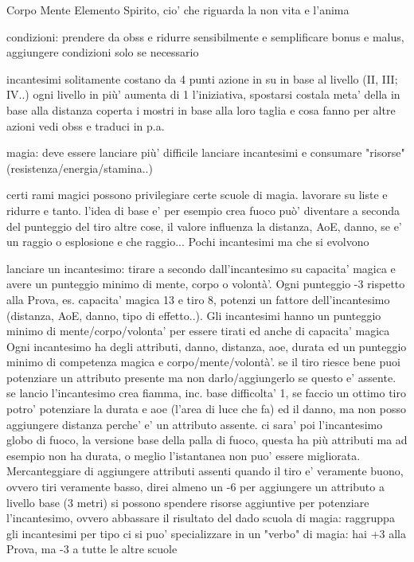 \documentclass[12pt,a4paper,twoside,openany]{book}
\begin{document}
Corpo
Mente
Elemento
Spirito, cio' che riguarda la non vita e l'anima






condizioni: prendere da obss e ridurre sensibilmente  e semplificare bonus e malus, aggiungere condizioni solo se necessario

incantesimi solitamente costano da 4 punti azione in su in base  al livello (II, III; IV..) ogni livello in più' aumenta di 1 l'iniziativa, spostarsi costala meta' della in base alla distanza coperta
i mostri in base alla loro taglia e cosa fanno
per altre azioni vedi obss e traduci in p.a.

magia: deve essere lanciare più' difficile lanciare incantesimi e consumare "risorse" (resistenza/energia/stamina..)

certi rami magici possono privilegiare certe scuole di magia. lavorare su liste e ridurre e tanto. l'idea di base e' per esempio crea fuoco può' diventare a seconda del punteggio del tiro altre cose, il valore influenza la distanza, AoE, danno, se e' un raggio o esplosione e che raggio...  Pochi incantesimi ma che si evolvono

lanciare un incantesimo: tirare a secondo dall'incantesimo su capacita' magica e avere un punteggio minimo di  mente, corpo o volontà'.  Ogni punteggio -3 rispetto alla Prova, es. capacita' magica 13 e tiro 8, potenzi un fattore dell'incantesimo (distanza, AoE, danno, tipo di effetto..). Gli incantesimi hanno un punteggio minimo di mente/corpo/volonta' per essere tirati ed anche di capacita' magica
Ogni incantesimo ha degli attributi, danno, distanza, aoe, durata ed un punteggio minimo di competenza magica e corpo/mente/volontà'. se il tiro riesce bene puoi potenziare un attributo presente ma non darlo/aggiungerlo se questo e' assente. se lancio l'incantesimo crea fiamma, inc. base difficolta' 1, se faccio un ottimo tiro potro' potenziare la durata e aoe (l'area di luce che fa) ed il danno, ma non posso aggiungere distanza perche' e' un attributo assente.
ci sara' poi l'incantesimo globo di fuoco, la versione base della palla di fuoco, questa ha più attributi ma ad esempio non ha durata, o meglio l'istantanea non puo' essere migliorata.
Mercanteggiare di aggiungere attributi assenti quando il tiro e' veramente buono, ovvero tiri veramente basso, direi almeno un -6 per aggiungere un attributo a livello base (3 metri)
si possono spendere risorse aggiuntive per potenziare l'incantesimo, ovvero abbassare il risultato del dado
scuola di magia: raggruppa gli incantesimi per tipo
ci si puo' specializzare in un "verbo" di magia: hai +3 alla Prova, ma -3 a tutte le altre scuole
\end{document}
